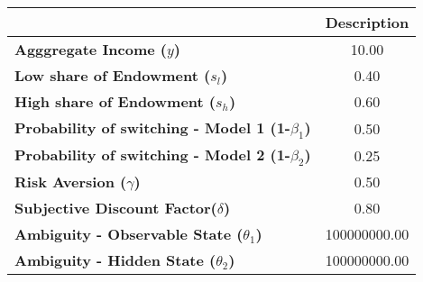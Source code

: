 \begin{tiny}\begin{tabular}{|l|c|}
\hline
&\textbf{Description}\\\hline
\textbf{Agggregate Income ($y$)}&10.00\\\hline
\textbf{Low share of Endowment ($s_l$)}&0.40\\\hline
\textbf{High share of Endowment ($s_h$)}&0.60\\\hline
\textbf{Probability of switching - Model 1 (1-$\beta_1$)}&0.50\\\hline
\textbf{Probability of switching - Model 2 (1-$\beta_2$)}&0.25\\\hline
\textbf{Risk Aversion ($\gamma$)}&0.50\\\hline
\textbf{Subjective Discount Factor($\delta$)}&0.80\\\hline
\textbf{Ambiguity - Observable State ($\theta_1$)}&100000000.00\\\hline
\textbf{Ambiguity - Hidden State ($\theta_2$)}&100000000.00\\\hline
\end{tabular}
\end{tiny}